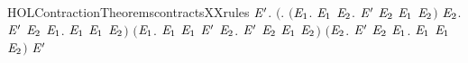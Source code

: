 \begin{SaveVerbatim}{HOLContractionTheoremscontractsXXrules}
\HOLTokenTurnstile{} \HOLSymConst{\HOLTokenForall{}} \ensuremath{\HOLBoundVar{E}\sp{\prime}}.
       \ensuremath{(}\HOLSymConst{\HOLTokenForall{}}.
            \ensuremath{(}\HOLSymConst{\HOLTokenForall{}}\ensuremath{\HOLBoundVar{E}\sb{\mathrm{1}}}.
                  \HOLTokenTransBegin{} \HOLTokenTransEnd \ensuremath{\HOLBoundVar{E}\sb{\mathrm{1}}} \HOLSymConst{\HOLTokenImp{}}
                 \HOLSymConst{\HOLTokenExists{}}\ensuremath{\HOLBoundVar{E}\sb{\mathrm{2}}}. \ensuremath{\HOLBoundVar{E}\sp{\prime}} \HOLTokenTransBegin{} \HOLTokenTransEnd \ensuremath{\HOLBoundVar{E}\sb{\mathrm{2}}} \HOLSymConst{\HOLTokenConj{}} \ensuremath{\HOLBoundVar{E}\sb{\mathrm{1}}}  \ensuremath{\HOLBoundVar{E}\sb{\mathrm{2}}}\ensuremath{)} \HOLSymConst{\HOLTokenConj{}}
            \HOLSymConst{\HOLTokenForall{}}\ensuremath{\HOLBoundVar{E}\sb{\mathrm{2}}}.
                \ensuremath{\HOLBoundVar{E}\sp{\prime}} \HOLTokenTransBegin{} \HOLTokenTransEnd \ensuremath{\HOLBoundVar{E}\sb{\mathrm{2}}} \HOLSymConst{\HOLTokenImp{}}
                \HOLSymConst{\HOLTokenExists{}}\ensuremath{\HOLBoundVar{E}\sb{\mathrm{1}}}.  \HOLTokenWeakTransBegin{} \HOLTokenWeakTransEnd \ensuremath{\HOLBoundVar{E}\sb{\mathrm{1}}} \HOLSymConst{\HOLTokenConj{}}  \ensuremath{\HOLBoundVar{E}\sb{\mathrm{1}}} \ensuremath{\HOLBoundVar{E}\sb{\mathrm{2}}}\ensuremath{)} \HOLSymConst{\HOLTokenConj{}}
       \ensuremath{(}\HOLSymConst{\HOLTokenForall{}}\ensuremath{\HOLBoundVar{E}\sb{\mathrm{1}}}.
             \HOLTokenTransBegin\HOLConst{\ensuremath{\tau}}\HOLTokenTransEnd \ensuremath{\HOLBoundVar{E}\sb{\mathrm{1}}} \HOLSymConst{\HOLTokenImp{}}
            \ensuremath{\HOLBoundVar{E}\sb{\mathrm{1}}}  \ensuremath{\HOLBoundVar{E}\sp{\prime}} \HOLSymConst{\HOLTokenDisj{}} \HOLSymConst{\HOLTokenExists{}}\ensuremath{\HOLBoundVar{E}\sb{\mathrm{2}}}. \ensuremath{\HOLBoundVar{E}\sp{\prime}} \HOLTokenTransBegin\HOLConst{\ensuremath{\tau}}\HOLTokenTransEnd \ensuremath{\HOLBoundVar{E}\sb{\mathrm{2}}} \HOLSymConst{\HOLTokenConj{}} \ensuremath{\HOLBoundVar{E}\sb{\mathrm{1}}}  \ensuremath{\HOLBoundVar{E}\sb{\mathrm{2}}}\ensuremath{)} \HOLSymConst{\HOLTokenConj{}}
       \ensuremath{(}\HOLSymConst{\HOLTokenForall{}}\ensuremath{\HOLBoundVar{E}\sb{\mathrm{2}}}. \ensuremath{\HOLBoundVar{E}\sp{\prime}} \HOLTokenTransBegin\HOLConst{\ensuremath{\tau}}\HOLTokenTransEnd \ensuremath{\HOLBoundVar{E}\sb{\mathrm{2}}} \HOLSymConst{\HOLTokenImp{}} \HOLSymConst{\HOLTokenExists{}}\ensuremath{\HOLBoundVar{E}\sb{\mathrm{1}}}.   \ensuremath{\HOLBoundVar{E}\sb{\mathrm{1}}} \HOLSymConst{\HOLTokenConj{}}  \ensuremath{\HOLBoundVar{E}\sb{\mathrm{1}}} \ensuremath{\HOLBoundVar{E}\sb{\mathrm{2}}}\ensuremath{)} \HOLSymConst{\HOLTokenImp{}}
         \ensuremath{\HOLBoundVar{E}\sp{\prime}}
\end{SaveVerbatim}
